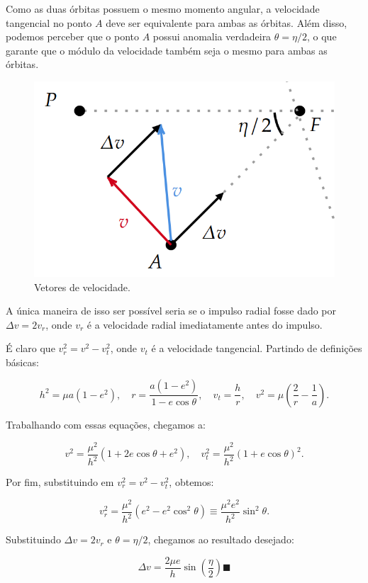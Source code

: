 \documentclass[11pt]{article}
\begin{document}
\begin{pproblem}
\begin{pssolution*}{}{}
        Como as duas órbitas possuem o mesmo momento angular, a velocidade tangencial no ponto \(A\) deve ser equivalente para ambas as órbitas. Além disso, podemos perceber que o ponto \(A\) possui anomalia verdadeira \(\theta = \eta/2\), o que garante que o módulo da velocidade também seja o mesmo para ambas as órbitas.

        \begin{figure}[H]
            \centering
            \includegraphics[width=0.7\linewidth]{imagens/rotorbt1.png}
            \caption{Vetores de velocidade.}
        \end{figure}

        A única maneira de isso ser possível seria se o impulso radial fosse dado por \(\Delta v = 2v_r\), onde \(v_r\) é a velocidade radial imediatamente antes do impulso.

        É claro que \(v_r^2 = v^2 - v_t^2\), onde \(v_t\) é a velocidade tangencial. Partindo de definições básicas:

        \[
        h^2 = \mu a (1 - e^2), \quad r = \frac{a(1 - e^2)}{1 - e\cos\theta}, \quad v_t = \frac{h}{r}, \quad v^2 = \mu \left(\frac{2}{r} - \frac{1}{a}\right).
        \]

        Trabalhando com essas equações, chegamos a:

        \[
        v^2 = \frac{\mu^2}{h^2}(1 + 2e\cos\theta + e^2), \quad v_t^2 = \frac{\mu^2}{h^2}(1 + e\cos\theta)^2.
        \]

        Por fim, substituindo em \(v_r^2 = v^2 - v_t^2\), obtemos:

        \[
        v_r^2 = \frac{\mu^2}{h^2}(e^2 - e^2\cos^2\theta) \equiv \frac{\mu^2e^2}{h^2}\sin^2\theta.
        \]

        Substituindo \(\Delta v = 2v_r\) e \(\theta = \eta/2\), chegamos ao resultado desejado:

        \[
        \boxed{\Delta v = \frac{2\mu e}{h}\sin\left(\frac{\eta}{2}\right) \blacksquare}
        \]
    \end{pssolution*}
\end{pproblem}
\end{document}
